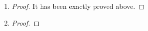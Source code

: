 \documentclass[paper=a4, fontsize=11pt]{scrartcl} %
\numberwithin{equation}{section} %
\numberwithin{figure}{section} %
\numberwithin{table}{section} %
\begin{document}
\begin{enumerate}
	\item 
		\begin{proof}
			It has been exactly proved above.
		\end{proof}
	
	\item 
		\begin{proof}
			
		\end{proof}
	
\end{enumerate}
\end{document}
